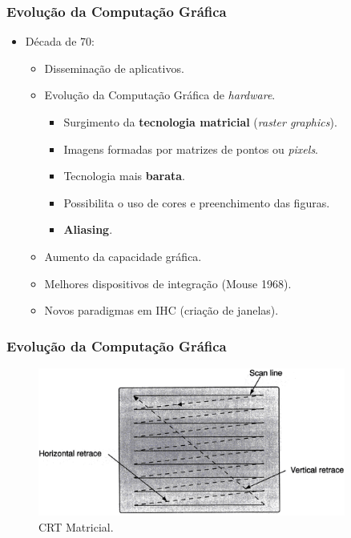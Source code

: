 \documentclass{beamer}
\begin{document}


\begin{frame}
\frametitle{Evolução da Computação Gráfica}

\begin{block}

	\begin{itemize}
		\item<1-> Década de 70:
		\begin{itemize}
			\item<1-> Disseminação de aplicativos.
			\item<1-> Evolução da Computação Gráfica de \textit{hardware}.
				\begin{itemize}
					\item Surgimento da \textbf{tecnologia matricial} (\textit{raster graphics}).
					\item Imagens formadas por matrizes de pontos ou \textit{pixels}.
					\item Tecnologia mais \textbf{barata}.
					\item Possibilita o uso de cores e preenchimento das figuras.
					\item \textbf{Aliasing}.
				\end{itemize}
			\item Aumento da capacidade gráfica.
			\item Melhores dispositivos de integração (Mouse 1968).
			\item Novos paradigmas em IHC (criação de janelas).
		\end{itemize}
	\end{itemize}
\end{block}

\end{frame}




\begin{frame}
\frametitle{Evolução da Computação Gráfica}

	\begin{figure}[!h]
		\begin{center}
			\includegraphics[width=0.9\textwidth]{Figures/matrixcrt}
			\caption{CRT Matricial.}
		\end{center}
		
	\end{figure}

\end{frame}
\end{document}
